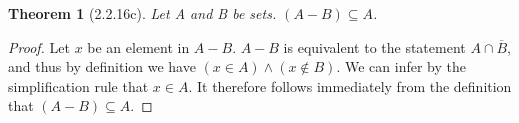 \documentclass[a4paper, 12pt]{article}
\theoremstyle{plain}
\newtheorem*{theorem*}{Theorem}
\begin{document}
	
	\begin{theorem*}[2.2.16c]
		Let A and B be sets. $(A - B) \subseteq A$.
	\end{theorem*}
	
	\begin{proof}
		Let $x$ be an element in $A - B$. $A - B$ is equivalent to the statement 
		$A \cap \overline{B}$, and thus by definition we have $(x \in A) \land (x \notin B)$. 
		We can infer by the simplification rule that $x \in A$. It therefore follows immediately 
		from the definition that $(A - B) \subseteq A$.
	\end{proof}
\end{document}
